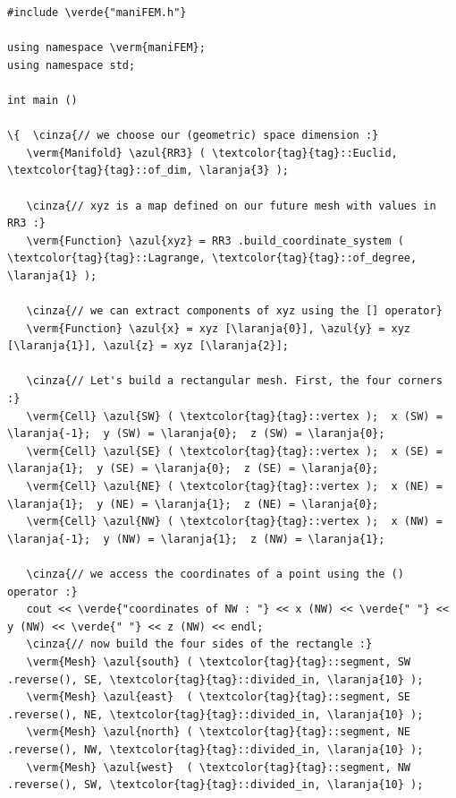 \begin{Verbatim}[commandchars=\\\{\},formatcom=\small\tt,frame=single,
   label=parag-\ref{\numb section 1.\numb parag 1}.cpp,rulecolor=\color{coment},
   baselinestretch=0.94,framesep=2mm                                            ]
#include \verde{"maniFEM.h"}

using namespace \verm{maniFEM};
using namespace std;

int main ()

\{  \cinza{// we choose our (geometric) space dimension :}
   \verm{Manifold} \azul{RR3} ( \textcolor{tag}{tag}::Euclid, \textcolor{tag}{tag}::of_dim, \laranja{3} );
   
   \cinza{// xyz is a map defined on our future mesh with values in RR3 :}
   \verm{Function} \azul{xyz} = RR3 .build_coordinate_system ( \textcolor{tag}{tag}::Lagrange, \textcolor{tag}{tag}::of_degree, \laranja{1} );

   \cinza{// we can extract components of xyz using the [] operator}
   \verm{Function} \azul{x} = xyz [\laranja{0}], \azul{y} = xyz [\laranja{1}], \azul{z} = xyz [\laranja{2}];

   \cinza{// Let's build a rectangular mesh. First, the four corners :}
   \verm{Cell} \azul{SW} ( \textcolor{tag}{tag}::vertex );  x (SW) = \laranja{-1};  y (SW) = \laranja{0};  z (SW) = \laranja{0};
   \verm{Cell} \azul{SE} ( \textcolor{tag}{tag}::vertex );  x (SE) =  \laranja{1};  y (SE) = \laranja{0};  z (SE) = \laranja{0};
   \verm{Cell} \azul{NE} ( \textcolor{tag}{tag}::vertex );  x (NE) =  \laranja{1};  y (NE) = \laranja{1};  z (NE) = \laranja{0};
   \verm{Cell} \azul{NW} ( \textcolor{tag}{tag}::vertex );  x (NW) = \laranja{-1};  y (NW) = \laranja{1};  z (NW) = \laranja{1};
   
   \cinza{// we access the coordinates of a point using the () operator :}
   cout << \verde{"coordinates of NW : "} << x (NW) << \verde{" "} << y (NW) << \verde{" "} << z (NW) << endl;
   \cinza{// now build the four sides of the rectangle :}
   \verm{Mesh} \azul{south} ( \textcolor{tag}{tag}::segment, SW .reverse(), SE, \textcolor{tag}{tag}::divided_in, \laranja{10} );
   \verm{Mesh} \azul{east}  ( \textcolor{tag}{tag}::segment, SE .reverse(), NE, \textcolor{tag}{tag}::divided_in, \laranja{10} );
   \verm{Mesh} \azul{north} ( \textcolor{tag}{tag}::segment, NE .reverse(), NW, \textcolor{tag}{tag}::divided_in, \laranja{10} );
   \verm{Mesh} \azul{west}  ( \textcolor{tag}{tag}::segment, NW .reverse(), SW, \textcolor{tag}{tag}::divided_in, \laranja{10} );
   

\end{Verbatim}
